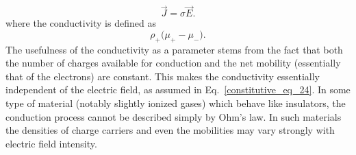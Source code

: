 \documentclass[11pt,a4paper,oneside]{book}
\numberwithin{equation}{section}
\theoremstyle{it}
\theoremstyle{definition}
\begin{document}
\begin{equation}\label{constitutive_eq_31}
	\vec{J}=\sigma\vec{E}.
\end{equation}
where the conductivity is defined as 
\begin{equation}\label{constitutive_eq_32}
	\rho_{+}\big(\mu_{+}-\mu_{-}\big).
\end{equation}
The usefulness of the conductivity as a parameter stems from the fact that both the number of charges available for conduction and the net mobility (essentially that of the electrons) are constant. This makes the conductivity essentially independent of the electric field, as assumed in Eq.~\eqref{constitutive_eq_24}. In some type of material (notably slightly ionized gases) which behave like insulators, the conduction process cannot be described simply by Ohm's law. In such materials the densities of charge carriers and even the mobilities may vary strongly with electric field intensity.
\end{document}
